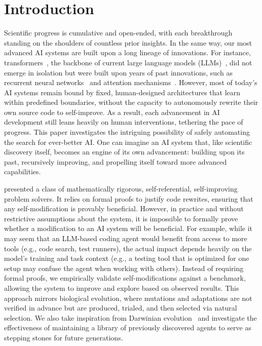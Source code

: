 \section{Introduction}
\label{sec:intro}

Scientific progress is cumulative and open-ended, with each breakthrough standing on the shoulders of countless prior insights. In the same way, our most advanced AI systems are built upon a long lineage of innovations. For instance, transformers~\citep{vaswani2017attention}, the backbone of current large language models (LLMs)~\citep{brown2020language}, did not emerge in isolation but were built upon years of past innovations, such as recurrent neural networks~\citep{linnainmaa1970representation, amari1972learning,  hopfield1982neural, rumelhart1985learning} and attention mechanisms~\citep{schmidhuber1990learning, bahdanau2015neural, kim2017structured, parikh2016decomposable}. However, most of today’s AI systems remain bound by fixed, human-designed architectures that learn within predefined boundaries, without the capacity to autonomously rewrite their own source code to self-improve. As a result, each advancement in AI development still leans heavily on human interventions, tethering the pace of progress. This paper investigates the intriguing possibility of safely automating the search for ever-better AI. One can imagine an AI system that, like scientific discovery itself, becomes an engine of its own advancement: building upon its past, recursively improving, and propelling itself toward more advanced capabilities.



\citet{schmidhuber2007godel} presented a class of mathematically rigorous, self-referential, self-improving problem solvers. It relies on formal proofs to justify code rewrites, ensuring that any self-modification is provably beneficial. However, in practice and without restrictive assumptions about the system, it is impossible to formally prove whether a modification to an AI system will be beneficial. For example, while it may seem that an LLM-based coding agent would benefit from access to more tools (e.g., code search, test runners), the actual impact depends heavily on the model’s training and task context (e.g., a testing tool that is optimized for one setup may confuse the agent when working with others). Instead of requiring formal proofs, we empirically validate self-modifications against a benchmark, allowing the system to improve and explore based on observed results. This approach mirrors biological evolution, where mutations and adaptations are not verified in advance but are produced, trialed, and then selected via natural selection. We also take inspiration from Darwinian evolution~\citep{darwin2023origin} and investigate the effectiveness of maintaining a library of previously discovered agents to serve as stepping stones for future generations.

